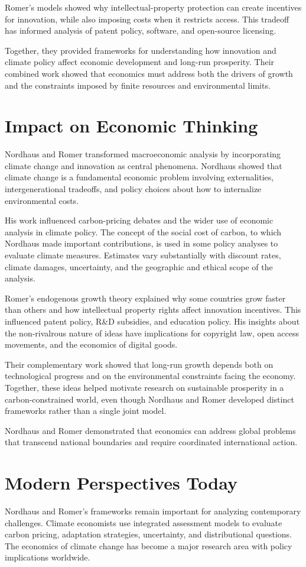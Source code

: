 Romer's models showed why intellectual-property protection can create incentives
for innovation, while also imposing costs when it restricts access. This tradeoff
has informed analysis of patent policy, software, and open-source licensing.

Together, they provided frameworks for understanding how innovation and climate
policy affect economic development and long-run prosperity. Their combined work
showed that economics must address both the drivers of growth and the constraints
imposed by finite resources and environmental limits.

\section{Impact on Economic Thinking}
Nordhaus and Romer transformed macroeconomic analysis by incorporating climate
change and innovation as central phenomena. Nordhaus showed that climate change
is a fundamental economic problem involving externalities, intergenerational
tradeoffs, and policy choices about how to internalize environmental costs.

His work influenced carbon-pricing debates and the wider use of economic analysis
in climate policy. The concept of the social cost of carbon, to which Nordhaus
made important contributions, is used in some policy analyses to evaluate climate
measures. Estimates vary substantially with discount rates, climate damages,
uncertainty, and the geographic and ethical scope of the analysis.

Romer's endogenous growth theory explained why some countries grow faster than
others and how intellectual property rights affect innovation incentives. This
influenced patent policy, R\&D subsidies, and education policy. His insights
about the non-rivalrous nature of ideas have implications for copyright law,
open access movements, and the economics of digital goods.

Their complementary work showed that long-run growth depends both on technological
progress and on the environmental constraints facing the economy. Together, these
ideas helped motivate research on sustainable prosperity in a carbon-constrained
world, even though Nordhaus and Romer developed distinct frameworks rather than a
single joint model.

Nordhaus and Romer demonstrated that economics can address global problems that
transcend national boundaries and require coordinated international action.

\section{Modern Perspectives Today}
Nordhaus and Romer's frameworks remain important for analyzing contemporary
challenges. Climate economists use integrated assessment models to evaluate
carbon pricing, adaptation strategies, uncertainty, and distributional questions.
The economics of climate change has become a major research area with policy
implications worldwide.

